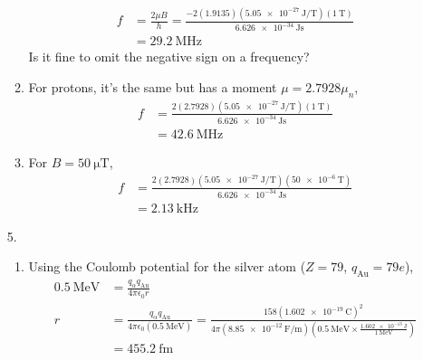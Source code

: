 \documentclass{homework}
\begin{document}
\begin{enumerate}
\begin{enumerate}
			\begin{align*}
				f & = \frac{2 \mu B}{h} = \frac{-2 (1.9135) \left(\SI{5.05e-27}{\joule\per\tesla} \right) \left(\SI{1}{\tesla}\right)}{\SI{6.626e-34}{\joule\second}} \\
					& = \SI{29.2}{\MHz}
			\end{align*}
			Is it fine to omit the negative sign on a frequency? 
			\item For protons, it's the same but has a moment $\mu = 2.7928\mu_n$,\begin{align*}
			f  & = \frac{2 (2.7928) \left(\SI{5.05e-27}{\joule\per\tesla} \right) \left(\SI{1}{\tesla}\right)}{\SI{6.626e-34}{\joule\second}}  \\
				& = \SI{42.6}{\MHz}
			\end{align*}
			
			\item For $B=\SI{50}{\micro\tesla}$,
			\begin{align*}
			f  & = \frac{2 (2.7928) \left(\SI{5.05e-27}{\joule\per\tesla} \right) \left(\SI{50e-6}{\tesla}\right)}{\SI{6.626e-34}{\joule\second}}  \\
			& = \SI{2.13}{\kHz}
			\end{align*}
		\end{enumerate}
		\item[5.] \begin{enumerate}
			\item Using the Coulomb potential for the silver atom ($Z=79$, $q_\text{Au}=79e$), \begin{align*}
				\SI{0.5}{\MeV} & = \frac{q_\alpha q_\text{Au}}{4\pi \epsilon_0 r} \\
				r & = \frac{q_\alpha q_\text{Au}}{4 \pi \epsilon_0 \left(\SI{0.5}{\MeV}\right)}
				= \frac{158 \left( \SI{1.602e-19}{\coulomb} \right)^2}{4\pi \left(\SI{8.85	e-12}{\F\per\m}\right) \left(\SI{0.5}{\MeV} \times  \frac{\SI{1.602e-13}{\J}}{\SI{1}{\MeV}}\right)} \\
				& = \SI{455.2}{\femto\meter}
			\end{align*}
			

\end{enumerate}
\end{enumerate}
\end{document}
